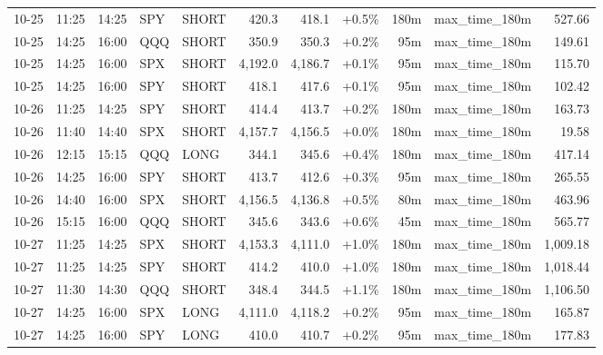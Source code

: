 \documentclass[11pt,a4paper,twoside]{article}
\begin{document}
\begin{center}
\begin{longtable}{>{\color{txtmain}}l l l l l r r r r >{\color{txtmain}}l r}
10-25 & 11:25 & 14:25 & SPY & SHORT & 420.3 & 418.1 & \textcolor{wingreen}{+0.5\%} & 180m & max\_time\_180m & \textcolor{wingreen}{527.66} \\
10-25 & 14:25 & 16:00 & QQQ & SHORT & 350.9 & 350.3 & \textcolor{wingreen}{+0.2\%} & 95m & max\_time\_180m & \textcolor{wingreen}{149.61} \\
10-25 & 14:25 & 16:00 & SPX & SHORT & 4,192.0 & 4,186.7 & \textcolor{wingreen}{+0.1\%} & 95m & max\_time\_180m & \textcolor{wingreen}{115.70} \\
10-25 & 14:25 & 16:00 & SPY & SHORT & 418.1 & 417.6 & \textcolor{wingreen}{+0.1\%} & 95m & max\_time\_180m & \textcolor{wingreen}{102.42} \\
10-26 & 11:25 & 14:25 & SPY & SHORT & 414.4 & 413.7 & \textcolor{wingreen}{+0.2\%} & 180m & max\_time\_180m & \textcolor{wingreen}{163.73} \\
10-26 & 11:40 & 14:40 & SPX & SHORT & 4,157.7 & 4,156.5 & \textcolor{wingreen}{+0.0\%} & 180m & max\_time\_180m & \textcolor{wingreen}{19.58} \\
10-26 & 12:15 & 15:15 & QQQ & LONG & 344.1 & 345.6 & \textcolor{wingreen}{+0.4\%} & 180m & max\_time\_180m & \textcolor{wingreen}{417.14} \\
10-26 & 14:25 & 16:00 & SPY & SHORT & 413.7 & 412.6 & \textcolor{wingreen}{+0.3\%} & 95m & max\_time\_180m & \textcolor{wingreen}{265.55} \\
10-26 & 14:40 & 16:00 & SPX & SHORT & 4,156.5 & 4,136.8 & \textcolor{wingreen}{+0.5\%} & 80m & max\_time\_180m & \textcolor{wingreen}{463.96} \\
10-26 & 15:15 & 16:00 & QQQ & SHORT & 345.6 & 343.6 & \textcolor{wingreen}{+0.6\%} & 45m & max\_time\_180m & \textcolor{wingreen}{565.77} \\
10-27 & 11:25 & 14:25 & SPX & SHORT & 4,153.3 & 4,111.0 & \textcolor{wingreen}{+1.0\%} & 180m & max\_time\_180m & \textcolor{wingreen}{1,009.18} \\
10-27 & 11:25 & 14:25 & SPY & SHORT & 414.2 & 410.0 & \textcolor{wingreen}{+1.0\%} & 180m & max\_time\_180m & \textcolor{wingreen}{1,018.44} \\
10-27 & 11:30 & 14:30 & QQQ & SHORT & 348.4 & 344.5 & \textcolor{wingreen}{+1.1\%} & 180m & max\_time\_180m & \textcolor{wingreen}{1,106.50} \\
10-27 & 14:25 & 16:00 & SPX & LONG & 4,111.0 & 4,118.2 & \textcolor{wingreen}{+0.2\%} & 95m & max\_time\_180m & \textcolor{wingreen}{165.87} \\
10-27 & 14:25 & 16:00 & SPY & LONG & 410.0 & 410.7 & \textcolor{wingreen}{+0.2\%} & 95m & max\_time\_180m & \textcolor{wingreen}{177.83} \\

\end{longtable}
\end{center}
\end{document}
